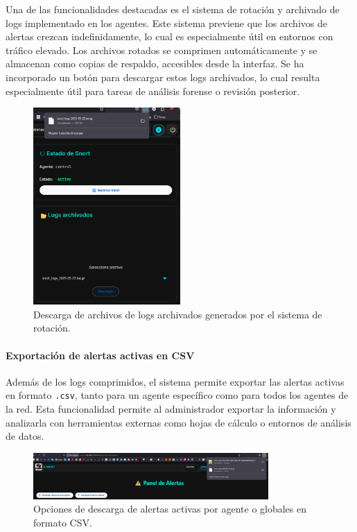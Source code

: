\documentclass[11pt,a4paper,twoside]{report}
\begin{document}
Una de las funcionalidades destacadas es el sistema de rotación y archivado de logs implementado en los agentes. Este sistema previene que los archivos de alertas crezcan indefinidamente, lo cual es especialmente útil en entornos con tráfico elevado. Los archivos rotados se comprimen automáticamente y se almacenan como copias de respaldo, accesibles desde la interfaz. Se ha incorporado un botón para descargar estos logs archivados, lo cual resulta especialmente útil para tareas de análisis forense o revisión posterior.

\begin{figure}[H]
	\centering
	\includegraphics[width=0.5\textwidth]{pruebas/3.png}
	\caption{Descarga de archivos de logs archivados generados por el sistema de rotación.}
	\label{fig:descarga_logs_archivados}
\end{figure}

\paragraph{Exportación de alertas activas en CSV}

Además de los logs comprimidos, el sistema permite exportar las alertas activas en formato \texttt{.csv}, tanto para un agente específico como para todos los agentes de la red. Esta funcionalidad permite al administrador exportar la información y analizarla con herramientas externas como hojas de cálculo o entornos de análisis de datos.

\begin{figure}[H]
	\centering
	\includegraphics[width=0.8\textwidth]{pruebas/4.png}
	\caption{Opciones de descarga de alertas activas por agente o globales en formato CSV.}
	\label{fig:descarga_alertas_csv}
\end{figure}
\end{document}
